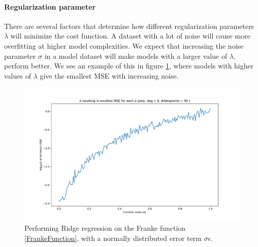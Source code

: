 \documentclass[11pt,a4paper,titlepage]{article}
\begin{document}
\paragraph*{Regularization parameter}
There are several factors that determine how different regularization parameters $\lambda$ will minimize the cost function. A dataset with a lot of noise will cause more overfitting at higher model complexities. We expect that increasing the noise parameter $\sigma$ in a model dataset will make models with a larger value of $\lambda$, perform better. We see an example of this in figure \ref{lambdatonoise}, where models with higher values of $\lambda$ give the smallest MSE with increasing noise.
\begin{figure}[H]
\centering

\includegraphics[trim=2cm 1.0cm 2cm 1.4cm, clip=true,scale = 0.5]{Smallest_MSE_lambda_over_noise.pdf}
\caption[Optimal regularization parameter to noise]{Performing Ridge regression on the Franke function \eqref{FrankeFunction}, with a normally distributed error term $\sigma\epsilon$.}\label{lambdatonoise}
\end{figure}
\end{document}
